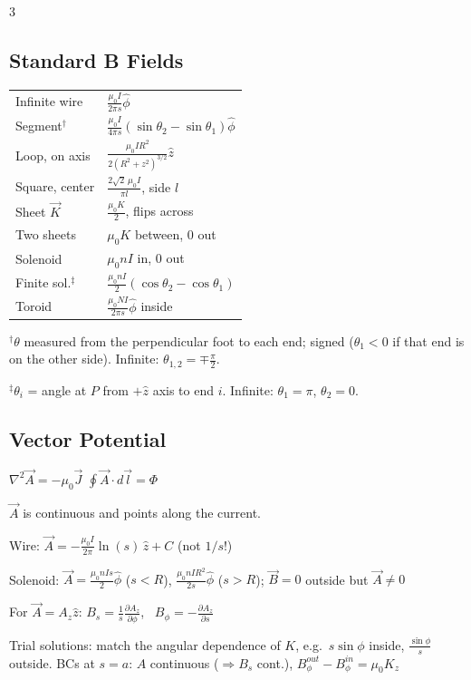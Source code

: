 \documentclass[11pt]{article}
\newcommand{\warn}[1]{\textcolor{red!70!black}{#1}}
\begin{document}
\begin{multicols*}{3}
\subsection*{Standard B Fields}

{\small\begin{tabularx}{\linewidth}{|l|X|}
\hline
Infinite wire & $\frac{\mu_0I}{2\pi s}\hat\phi$ \\
Segment$^\dagger$ & $\frac{\mu_0I}{4\pi s}(\sin\theta_2-\sin\theta_1)\hat\phi$ \\
Loop, on axis & $\frac{\mu_0IR^2}{2(R^2+z^2)^{3/2}}\hat z$ \\
Square, center & $\frac{2\sqrt2\,\mu_0I}{\pi l}$, side $l$ \\
Sheet $\vec K$ & $\frac{\mu_0K}{2}$, flips across \\
Two sheets & $\mu_0K$ between, 0 out \\
Solenoid & $\mu_0nI$ in, 0 out \\
Finite sol.$^\ddagger$ & $\frac{\mu_0nI}{2}(\cos\theta_2-\cos\theta_1)$ \\
Toroid & $\frac{\mu_0NI}{2\pi s}\hat\phi$ inside \\
\hline
\end{tabularx}}

{\footnotesize $^\dagger\theta$ measured from the perpendicular foot to each end; signed ($\theta_1<0$ if that end is on the other side). Infinite: $\theta_{1,2}=\mp\frac\pi2$.

$^\ddagger\theta_i$ = angle at $P$ from $+\hat z$ axis to end $i$. Infinite: $\theta_1=\pi$, $\theta_2=0$.}

\subsection*{Vector Potential}

$\nabla^2\vec A=-\mu_0\vec J$ \hfill $\oint\vec A\cdot d\vec l=\Phi$

$\vec A$ is continuous and points along the current.

Wire: $\vec A=-\frac{\mu_0I}{2\pi}\ln(s)\,\hat z+C$ \warn{(not $1/s$!)}

Solenoid: $\vec A=\frac{\mu_0nIs}{2}\hat\phi$ ($s<R$), $\frac{\mu_0nIR^2}{2s}\hat\phi$ ($s>R$); $\vec B=0$ outside but $\vec A\neq0$

For $\vec A=A_z\hat z$: $B_s=\frac1s\frac{\partial A_z}{\partial\phi}$, \ $B_\phi=-\frac{\partial A_z}{\partial s}$

Trial solutions: match the angular dependence of $K$, e.g.\ $s\sin\phi$ inside, $\frac{\sin\phi}{s}$ outside.
BCs at $s=a$: $A$ continuous ($\Rightarrow B_s$ cont.), $B_\phi^{out}-B_\phi^{in}=\mu_0K_z$


\end{multicols*}
\end{document}
